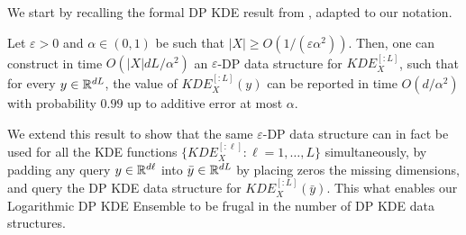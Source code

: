 We start by recalling the formal DP KDE result from \cite{wagner2023fast}, adapted to our notation.
\begin{lemma}\label{thm:dpkde}
 Let $\varepsilon>0$ and $\alpha\in(0,1)$ be such that $|X|\geq O(1/(\varepsilon\alpha^2))$. Then, one can construct in time $O(|X|dL/\alpha^2)$ an $\varepsilon$-DP data structure for $KDE^{[:L]}_X$, such that for every $y\in\mathbb R^{dL}$, the value of $KDE^{[:L]}_X(y)$ can be reported in time $O(d/\alpha^2)$ with probability $0.99$ up to additive error at most $\alpha$. 
\end{lemma}

We extend this result to show that the same $\varepsilon$-DP data structure can in fact be used for all the KDE functions $\{KDE_X^{[:\ell]}:\ell=1,\ldots,L\}$ simultaneously, by padding any query $y\in\mathbb R^{d\ell}$ into $\bar{y}\in\mathbb R^{dL}$ by placing zeros the missing dimensions, and query the DP KDE data structure for $KDE^{[:L]}_X(\bar y)$. This what enables our Logarithmic DP KDE Ensemble to be frugal in the number of DP KDE data structures. 

